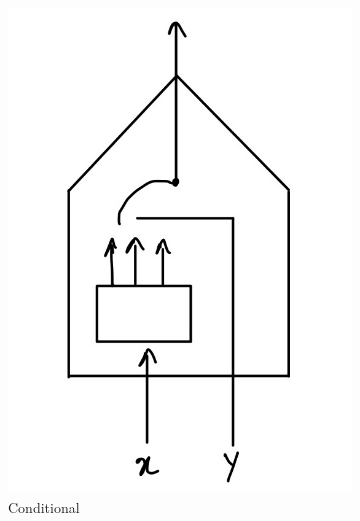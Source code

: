 \begin{figure}[htb]
    \centering
    \begin{subfigure}[b]{0.2\textwidth}
        \includegraphics[width=\textwidth]{figs/EBM6-2.jpg}
        \caption{Conditional}
        \label{fig:energybasedmodel1}
    \end{subfigure}
    \begin{subfigure}[b]{0.2\textwidth}

\end{subfigure}
\end{figure}
